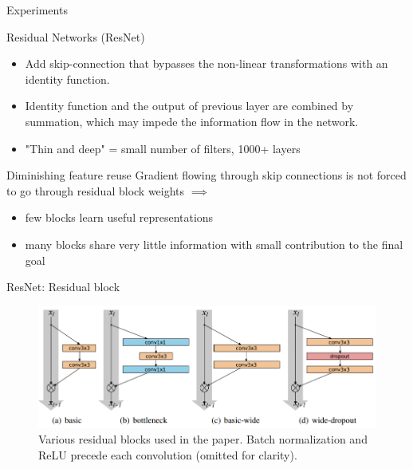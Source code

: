 \documentclass{beamer}
\begin{document}
\begin{frame}{Experiments}




\end{frame}
\begin{frame}{Residual Networks (ResNet)}
\begin{itemize}
\item Add skip-connection that bypasses the non-linear transformations with an identity function.
\item Identity function and the output of previous layer are combined by summation, which may impede the information flow in the network.
\item "Thin and deep" = small number of filters, 1000+ layers
\end{itemize}

\begin{block}{Diminishing feature reuse}
Gradient flowing through skip connections is not forced to go through residual block weights $\implies$ 

\begin{itemize}
\item few blocks learn useful representations 
\item many blocks share very little information with
small contribution to the final goal
\end{itemize}
\end{block}

\end{frame}
\begin{frame}{ResNet: Residual block}
\begin{figure}[h]
\includegraphics[width=\textwidth]{img/resnet_blocks}
\caption{Various residual blocks used in the paper. Batch normalization and ReLU precede
each convolution (omitted for clarity). \cite{cit:resnet}}
\end{figure}
\end{frame}
\end{document}
